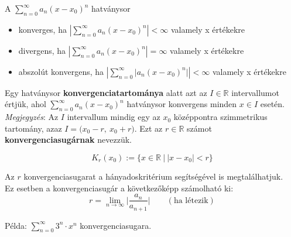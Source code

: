\documentclass[tikz,12pt,margin=0px]{article}
\newcommand\ddfrac[2]{\frac{\displaystyle #1}{\displaystyle #2}}
\begin{document}

    \noindent A $\sum\limits_{n=0}^{\infty}a_{n}(x-x_{0})^{n}$ hatványsor
    \begin{itemize}
        \item konverges, ha $\left|\sum\limits_{n=0}^{\infty}a_{n}(x-x_{0})^{n}\right| < \infty$ valamely x értékekre
        \item divergens, ha $\left|\sum\limits_{n=0}^{\infty}a_{n}(x-x_{0})^{n}\right| = \infty$ valamely x értékekre
        \item abszolút konvergens, ha $\left|\sum\limits_{n=0}^{\infty}\big|a_{n}(x-x_{0})^{n}\big|\right| < \infty$ valamely x értékekre
    \end{itemize}

    \noindent Egy hatványsor \textbf{konvergenciatartománya} alatt azt az $I \in \mathbb{R}$ intervallumot értjük, ahol $\sum\limits_{n=0}^{\infty}a_{n}(x-x_{0})^{n}$ hatványsor konvergens minden $x \in I$ esetén.\\

    \noindent \emph{Megjegyzés}: Az $I$ intervallum mindig egy az $x_{0}$  középpontra szimmetrikus tartomány, azaz $I = \Big(x_{0} - r,\ x_{0} + r\Big)$. Ezt az $r \in \mathbb{R}$ számot \textbf{konvergenciasugárnak} nevezzük.

    \[
        K_{r}(x_{0}) := \Big\{x \in \mathbb{R}\ \Big|\ \big|x-x_{0}\big| < r\Big\}
    \]

    \noindent Az $r$ konvergenciasugarat  a hányadoskritérium segítségével is megtalálhatjuk.\\
    Ez esetben a konvergenciasugár a következőképp számolható ki:
    \[
        r = \lim\limits_{n \to \infty}^{}\Big|\ddfrac{a_{n}}{a_{n+1}}\Big| \qquad (\text{ha létezik})
    \]

    \noindent Példa: $\sum\limits_{n=0}^{\infty}3^{n} \cdot x^{n}$ konvergenciasugara.\\
\end{document}
